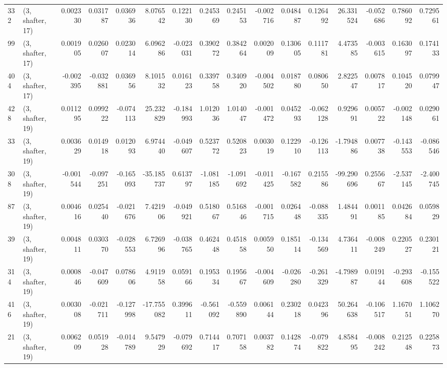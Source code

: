 \begin{tabular}{llrrrrrrrrrrrrrr}
332 &  (3, shafter, 17) &   0.002330 &  0.031787 &  0.036936 &    8.076542 &  0.122130 &   0.245369 &  0.245153 & -0.002716 &  0.048487 &  0.126492 &   26.331524 & -0.052686 &  0.786092 &  0.729561 \\
99  &  (3, shafter, 17) &   0.001905 &  0.026007 &  0.023014 &    6.096286 & -0.023031 &   0.390272 &  0.384264 &  0.002009 &  0.130605 &  0.111781 &    4.473585 & -0.003615 &  0.163097 &  0.174133 \\
404 &  (3, shafter, 17) &  -0.002395 & -0.032881 &  0.036956 &    8.101532 &  0.016123 &   0.339758 &  0.340920 & -0.004502 &  0.018780 &  0.080650 &    2.822547 &  0.007817 &  0.104520 &  0.079947 \\
428 &  (3, shafter, 19) &   0.011295 &  0.099222 & -0.074113 &   25.232829 & -0.184993 &   1.012036 &  1.014047 & -0.001472 &  0.045293 & -0.062128 &    0.929691 &  0.005722 & -0.002148 &  0.029061 \\
33  &  (3, shafter, 19) &   0.003629 &  0.014918 &  0.012093 &    6.974440 & -0.049607 &   0.523772 &  0.520823 &  0.003019 &  0.122910 & -0.126113 &   -1.794886 &  0.007738 & -0.143553 & -0.086546 \\
308 &  (3, shafter, 19) &  -0.001544 & -0.097251 & -0.165093 &  -35.185737 &  0.613797 &  -1.081185 & -1.091692 & -0.011425 & -0.167582 &  0.215586 &  -99.290696 &  0.255667 & -2.537145 & -2.400745 \\
87  &  (3, shafter, 19) &   0.004616 &  0.025440 & -0.021676 &    7.421906 & -0.049921 &   0.518067 &  0.516846 & -0.001715 &  0.026448 & -0.088335 &    1.484491 &  0.001185 &  0.042684 &  0.059829 \\
39  &  (3, shafter, 19) &   0.004811 &  0.030370 & -0.028553 &    6.726996 & -0.038765 &   0.462448 &  0.451858 &  0.005950 &  0.185114 & -0.134569 &    4.736411 & -0.008249 &  0.220527 &  0.230121 \\
314 &  (3, shafter, 19) &   0.000846 & -0.047609 &  0.078606 &    4.911958 &  0.059166 &   0.195334 &  0.195667 & -0.004609 & -0.026280 & -0.261329 &   -4.798987 &  0.019144 & -0.293608 & -0.155522 \\
416 &  (3, shafter, 19) &   0.003008 & -0.021711 & -0.127998 &  -17.755082 &  0.399611 &  -0.561092 & -0.559890 &  0.006144 &  0.230218 &  0.042396 &   50.264638 & -0.106517 &  1.167051 &  1.106270 \\
21  &  (3, shafter, 19) &   0.006209 &  0.051928 & -0.014789 &    9.547929 & -0.079692 &   0.714417 &  0.707158 &  0.003782 &  0.142874 & -0.079822 &    4.858495 & -0.008242 &  0.212548 &  0.225873 \\

\end{tabular}
